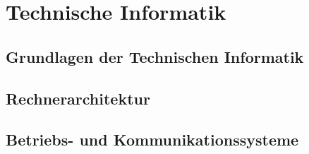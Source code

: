 \part{Technische Informatik}
\chapter{Grundlagen der Technischen Informatik}
\chapter{Rechnerarchitektur}
\chapter{Betriebs- und Kommunikationssysteme}

